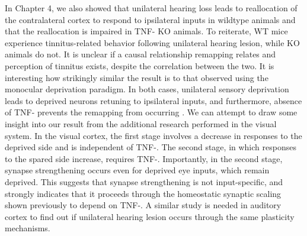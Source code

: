 In Chapter 4, we also showed that unilateral hearing loss leads to reallocation of the contralateral cortex to respond to ipsilateral inputs in wildtype animals and that the reallocation is impaired in TNF-\textalpha{} KO animals. To reiterate, WT mice experience tinnitus-related behavior following unilateral hearing lesion, while KO animals do not. It is unclear if a causal relationship remapping relates and perception of tinnitus exists, despite the correlation between the two. It is interesting how strikingly similar the result is to that observed using the monocular deprivation paradigm. In both cases, unilateral sensory deprivation leads to deprived neurons retuning to ipsilateral inputs, and furthermore, absence of TNF-\textalpha{} prevents the remapping from occurring \cite{Mrsic-Flogel2007, Kaneko2008}. We can attempt to draw some insight into our result from the additional research performed in the visual system. In the visual cortex, the first stage involves a decrease in responses to the deprived side and is independent of TNF-\textalpha{}. The second stage, in which responses to the spared side increase, requires TNF-\textalpha{}. Importantly, in the second stage, synapse strengthening occurs even for deprived eye inputs, which remain deprived. This suggests that synapse strengthening is not input-specific, and strongly indicates that it proceeds through the homeostatic synaptic scaling shown previously to depend on TNF-\textalpha{}. A similar study is needed in auditory cortex to find out if unilateral hearing lesion occurs through the same plasticity mechanisms.

